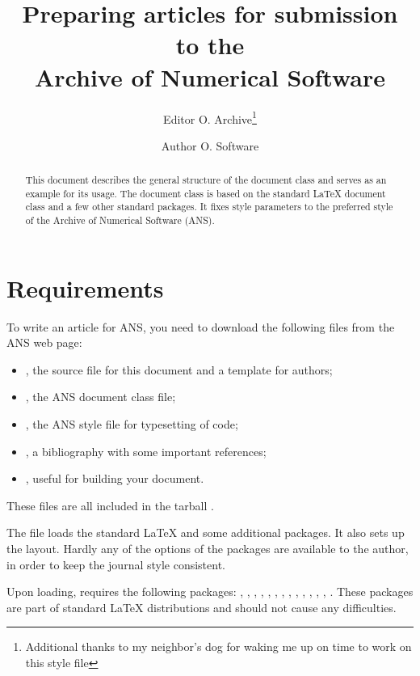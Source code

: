 \documentclass{ansarticle}
\title{Preparing articles for submission to the \\
       Archive of Numerical Software}
\author[1]{Editor O. Archive\thanks{Additional thanks to my neighbor's dog
  for waking me up on time to work on this style file}}
\author[2]{Author O. Software}
\affil[1]{The Archive of Numerical Software}
\affil[2]{The Worlds Best Place for Numerical Software}
\begin{document}
\maketitle

\begin{abstract}
  This document describes the general structure of the
   document class and serves as an example for its
  usage. The  document class is based on the standard
  \LaTeX{}  document class and a few other standard
  packages. It fixes style parameters to the preferred style of the
  Archive of Numerical Software (ANS).
\end{abstract}

\section{Requirements}

To write an article for ANS, you need to download the following files
from the ANS web page:
\begin{itemize}
\item
  , the source file for this document and a template for
  authors;
\item
  , the ANS document class file;
\item
  , the ANS style file for typesetting of code;
\item
  , a bibliography with some important
  references;
\item
  , useful for building your document.
\end{itemize}
These files are all included in the tarball .

The file  loads the standard LaTeX
 and some additional packages. It also sets up the
layout. Hardly any of the options of the packages are available to the
author, in order to keep the journal style consistent.

Upon loading,  requires the following packages:
,
, , ,
,
, ,
,
,
,
,
,
,
.
These packages are part of standard \LaTeX{} distributions and should
not cause any difficulties.
\end{document}
